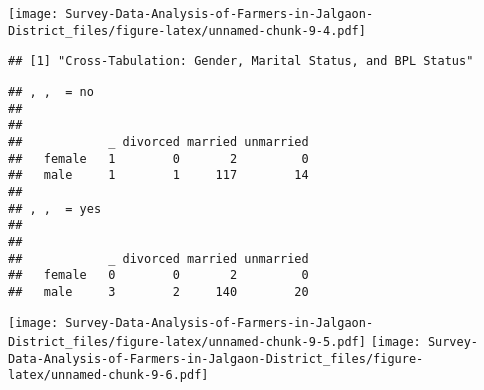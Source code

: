 \documentclass[
]{article}
\begin{document}
\texttt{[image: Survey-Data-Analysis-of-Farmers-in-Jalgaon-District\_files/figure-latex/unnamed-chunk-9-4.pdf]}

\begin{verbatim}
## [1] "Cross-Tabulation: Gender, Marital Status, and BPL Status"
\end{verbatim}

\begin{verbatim}
## , ,  = no
## 
##         
##            _ divorced married unmarried
##   female   1        0       2         0
##   male     1        1     117        14
## 
## , ,  = yes
## 
##         
##            _ divorced married unmarried
##   female   0        0       2         0
##   male     3        2     140        20
\end{verbatim}

\texttt{[image: Survey-Data-Analysis-of-Farmers-in-Jalgaon-District\_files/figure-latex/unnamed-chunk-9-5.pdf]}
\texttt{[image: Survey-Data-Analysis-of-Farmers-in-Jalgaon-District\_files/figure-latex/unnamed-chunk-9-6.pdf]}
\end{document}
